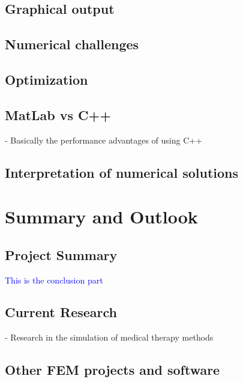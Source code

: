 \documentclass[parskip=half, titlepage=yes, 12pt, BCOR=12mm, DIV=calc]{scrartcl}
\begin{document}
\subsection{Graphical output}

\subsection{Numerical challenges}

\subsection{Optimization}

\subsection{MatLab vs C++}

- Basically the performance advantages of using C++

\subsection{Interpretation of numerical solutions}


\section{Summary and Outlook}

\subsection{Project Summary}


\textcolor{blue}
{
This is the conclusion part
}

\subsection{Current Research}
- Research in the simulation of medical therapy methods \\

\subsection{Other FEM projects and software}


\newpage


\clearpage
\nocite{*}
\printbibliography

\newpage

\appendix

 
\end{document}
